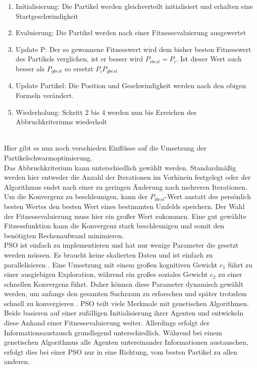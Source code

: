 \begin{enumerate}
  \item Initialisierung: Die Partikel werden gleichverteilt initialisiert und erhalten eine Startgeschwindigkeit
  \item Evaluierung: Die Partikel werden nach einer Fitnessevaluierung ausgewertet 
  \item Update P: Der so gewonnene Fitnesswert wird dem bisher besten Fitnesswert des Partikels verglichen, ist er besser wird $P_{ibest}=P_i$. Ist dieser Wert auch besser als $P_{gbest}$ so ersetzt $P_i P_{gbest}$
  \item Update Partikel: Die Position und Geschwindigkeit werden nach den obigen Formeln verändert.
  \item Wiederholung: Schritt 2 bis 4 werden nun bis Erreichen des Abbruchkriteriums wiederholt
\end{enumerate}\\

Hier gibt es nun noch verschieden Einflüsse auf die Umsetzung der Partikelschwarmoptimierung.\\
Das Abbruchkriterium kann unterschiedlich gewählt werden. Standardmäßig werden hier entweder die Anzahl der Iterationen im Vorhinein festgelegt oder der Algorithmus endet nach einer zu geringen Änderung nach mehreren Iterationen. 
Um die Konvergenz zu beschleunigen, kann der $P_{ibest}$-Wert anstatt des persönlich besten Wertes den besten Wert eines bestimmten Umfelds speichern.
Der Wahl der Fitnessevaluierung muss hier ein großer Wert zukommen. Eine gut gewählte Fitnessfunktion kann die Konvergenz stark beschleunigen und somit den benötigten Rechenaufwand minimieren.\\
PSO ist einfach zu implementieren und hat nur wenige Parameter die gesetzt werden müssen. Es braucht keine skalierten Daten und ist einfach zu parallelisieren \cite{poli2007particle}.
Eine Umsetzung mit einem großen kognitiven Gewicht $c_1$ führt zu einer ausgiebigen Exploration, während ein großes soziales Gewicht $c_2$ zu einer schnellen Konvergenz führt. Daher können diese Parameter dynamisch gewählt werden, um anfangs den gesamten Suchraum zu erforschen und später trotzdem schnell zu konvergieren \cite{suganthan1999particle}. 
PSO teilt viele Merkmale mit genetischen Algorithmen. Beide basieren auf einer zufälligen Initialisierung ihrer Agenten und entwickeln diese Anhand einer Fitnessevaluierung weiter. Allerdings erfolgt der Informationsaustausch grundlegend unterschiedlich. Während bei einem genetischen Algorithmus alle Agenten untereinander Informationen austauschen, erfolgt dies bei einer PSO nur in eine Richtung, vom besten Partikel zu allen anderen.\\


